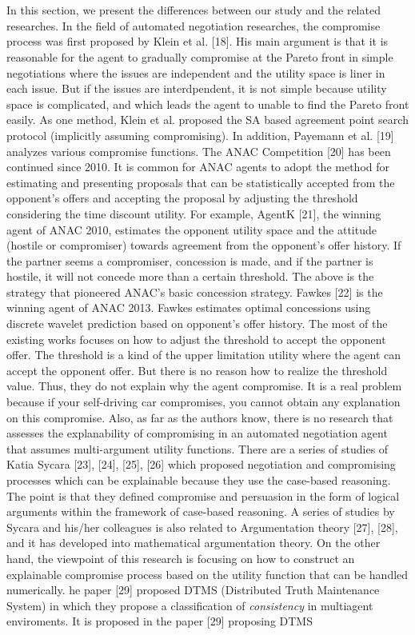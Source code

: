 \documentclass[paper]{ieice}
\begin{document}
\section{}
In this section, we present the differences between our study and the related researches. In the field of automated negotiation researches, the compromise process was first proposed by Klein et al. [18]. His main argument is that it is reasonable for the agent to gradually compromise at the Pareto front in simple negotiations where the issues are independent and the utility space is liner in each issue. But if the issues are interdpendent, it is not simple because utility space is complicated, and which leads the agent to unable to find the Pareto front easily. As one method, Klein et al. proposed the SA based agreement point search protocol (implicitly assuming compromising). In addition, Payemann et al. [19] analyzes various compromise functions. The ANAC Competition [20] has been continued since 2010. It is common for ANAC agents to adopt the method for estimating and presenting proposals that can be statistically accepted from the opponent's offers and accepting the proposal by adjusting the threshold considering the time discount utility. For example, AgentK [21], the winning agent of ANAC 2010, estimates the opponent utility space and the attitude (hostile or compromiser) towards agreement from the opponent's offer history. If the partner seems a compromiser, concession is made, and if the partner is hostile, it will not concede more than a certain threshold. The above is the strategy that pioneered ANAC's basic concession strategy. Fawkes [22] is the winning agent of ANAC 2013. Fawkes estimates optimal concessions using discrete wavelet prediction based on opponent's offer history. The most of the existing works focuses on how to adjust the threshold to accept the opponent offer. The threshold is a kind of the upper limitation utility where the agent can accept the opponent offer. But there is no reason how to realize the threshold value. Thus, they do not explain why the agent compromise. It is a real problem because if your self-driving car compromises, you cannot obtain any explanation on this compromise. Also, as far as the authors know, there is no research that assesses the explanability of compromising in an automated negotiation agent that assumes multi-argument utility functions. There are a series of studies of Katia Sycara [23], [24], [25], [26] which proposed negotiation and compromising processes which can be explainable because they use the case-based reasoning. The point is that they defined compromise and persuasion in the form of logical arguments within the framework of case-based reasoning. A series of studies by Sycara and his/her colleagues is also related to Argumentation theory [27], [28], and it has developed into mathematical argumentation theory. On the other hand, the viewpoint of this research is focusing on how to construct an explainable compromise process based on the utility function that can be handled numerically. he paper [29] proposed DTMS (Distributed Truth Maintenance System) in which they propose a classification of {\it consistency} in multiagent enviroments. It is proposed in the paper [29] proposing DTMS 
\end{document}
